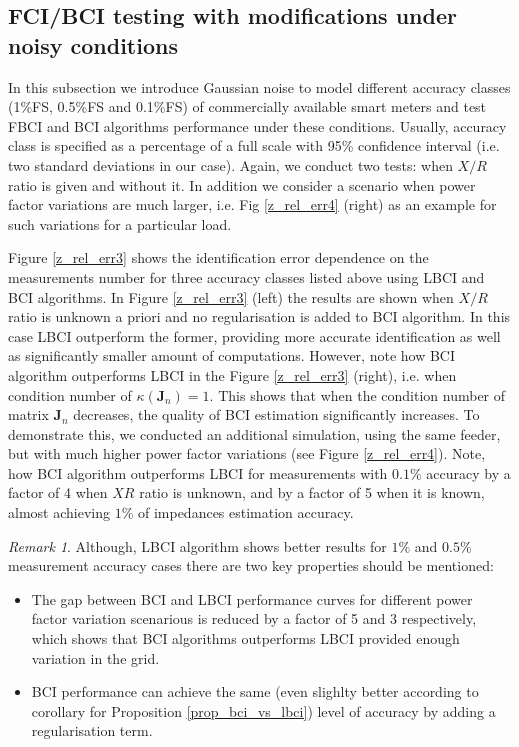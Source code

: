 \documentclass[journal,10pt,onecolumn,draftclsnofoot,]{IEEEtran}
\theoremstyle{plain}
\theoremstyle{definition}
\theoremstyle{remark}
\newtheorem*{remark}{Remark}
\begin{document}
\subsection{FCI/BCI testing with modifications under noisy conditions}
In this subsection we introduce Gaussian noise to model different accuracy classes (1\%FS, 0.5\%FS and 0.1\%FS) of commercially available smart meters and test FBCI and BCI algorithms performance under these conditions. Usually, accuracy class is specified as a percentage of a full scale with 95\% confidence interval (i.e. two standard deviations in our case). Again, we conduct two tests: when $X/R$ ratio is given and without it. In addition we consider a scenario when power factor variations are much larger, i.e. Fig \ref{z_rel_err4} (right) as an example for such variations for a particular load. 

Figure \ref{z_rel_err3} shows the identification error dependence on the measurements number for three accuracy classes listed above using LBCI and BCI algorithms. In Figure \ref{z_rel_err3} (left) the results are shown when $X/R$ ratio is unknown a priori and no regularisation is added to BCI algorithm. In this case LBCI outperform the former, providing more accurate identification as well as significantly smaller amount of computations. However, note how BCI algorithm outperforms LBCI in the Figure \ref{z_rel_err3} (right), i.e. when condition number of $\kappa(\bm{J}_n) = 1$. This shows that when the condition number of matrix $\bm{J}_n$ decreases, the quality of BCI estimation significantly increases. To demonstrate this, we conducted an additional simulation, using the same feeder, but with much higher power factor variations (see Figure \ref{z_rel_err4}). Note, how BCI algorithm outperforms LBCI for measurements with $0.1\%$ accuracy by a factor of 4 when $XR$ ratio is unknown, and by a factor of 5 when it is known, almost achieving $1\%$ of impedances estimation accuracy. 
\begin{remark}
Although, LBCI algorithm shows better results for $1\%$ and $0.5\%$ measurement accuracy cases there are two key properties should be mentioned:
\begin{itemize}
\item The gap between BCI and LBCI performance curves for different power factor variation scenarious is reduced by a factor of 5 and 3 respectively, which shows that BCI algorithms outperforms LBCI provided enough variation in the grid. 
\item BCI performance can achieve the same (even slighlty better according to corollary for Proposition \ref{prop_bci_vs_lbci}) level of accuracy by adding a regularisation term.
\end{itemize}
\end{remark}
\end{document}
